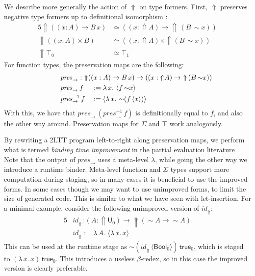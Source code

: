 \documentclass[acmsmall]{acmart}
\newcommand{\mit}[1]{\mathit{#1}}
\newcommand{\msf}[1]{\mathsf{#1}}
\newcommand{\Lift}{{\Uparrow}}
\newcommand{\spl}{{\sim}}
\newcommand{\qut}[1]{\langle #1\rangle}
\renewcommand{\U}{\msf{U}}
\newcommand{\Bool}{\msf{Bool}}
\newcommand{\true}{\msf{true}}
\theoremstyle{remark}
\begin{document}
We describe more generally the action of $\Lift$ on type formers. First, $\Lift$
preserves negative type formers up to definitional isomorphism \cite{twolevel}:
\begin{alignat*}{5}
  \Lift((x : A) \to B\,x) &\simeq ((x : \Lift A) \to \Lift\,(B\,\spl x))\\
  \Lift ((x : A) \times B) &\simeq ((x : \Lift A) \times \Lift (B\,\spl x))\\
  \Lift \top_0 &\simeq \top_1
\end{alignat*}
For function types, the preservation maps are the following:
\begin{alignat*}{5}
  & \hspace{-6em}\rlap{$\mit{pres}_\to : \Lift((x : A) \to B\,x) \to ((x : \Lift A) \to \Lift\,(B\,\spl x))$}\\
  & \hspace{-6em}\mit{pres}_\to\,f     &&:= \lambda\,x.\,\,\qut{f\,\spl x}\\
  & \hspace{-6em}\mit{pres}_\to^{-1}\,f &&:= \qut{\lambda\,x.\,\,\spl(f\,\qut{x})}
\end{alignat*}
With this, we have that $\mit{pres}_\to\,(\mit{pres}_\to^{-1}\,f)$ is
definitionally equal to $f$, and also the other way around. Preservation maps
for $\Sigma$ and $\top$ work analogously.

By rewriting a 2LTT program left-to-right along preservation maps, we perform
what is termed \emph{binding time improvement} in the partial evaluation
literature \cite{TODO}. Note that the output of $\mit{pres}_{\to}$ uses a
meta-level $\lambda$, while going the other way we introduce a runtime
binder. Meta-level function and $\Sigma$ types support more computation during
staging, so in many cases it is beneficial to use the improved forms. In some
cases though we may want to use unimproved forms, to limit the size of generated
code. This is similar to what we have seen with let-insertion. For a minimal
example, consider the following unimproved version of $\mit{id}_\Lift$:
\begin{alignat*}{5}
  & \mit{id}_\Lift : (A : \Lift \U_0) \to \Lift(\spl A \to \spl A) \\
  & \mit{id}_\Lift := \lambda\,A.\,\,\qut{\lambda\,x.\,x}
\end{alignat*}
This can be used at the runtime stage as
$\spl(\mit{id}_\Lift\,\qut{\Bool_0})\,\true_0$, which is staged to
$(\lambda\,x.\,x)\,\true_0$.  This introduces a useless $\beta$-redex, so in
this case the improved version is clearly preferable.
\end{document}
